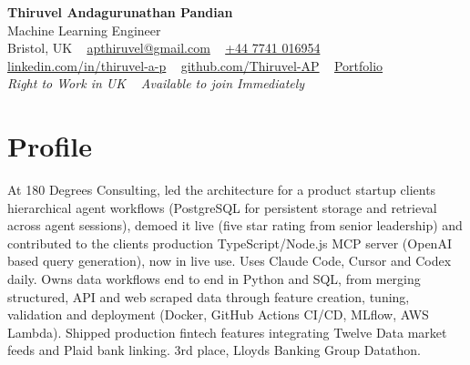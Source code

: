 \documentclass[a4paper,11pt]{article}
\begin{document}
\begin{center}
  {\fontsize{22}{26}\selectfont\bfseries\color{navy} Thiruvel Andagurunathan Pandian}\\[4pt]
  {\fontsize{12}{14}\selectfont\color{navy} Machine Learning Engineer}\\[4pt]
  {\small
  Bristol, UK\nobreak\ \,\textperiodcentered\, \href{mailto:apthiruvel@gmail.com}{apthiruvel@gmail.com}\nobreak\ \,\textperiodcentered\, \href{tel:+447741016954}{+44 7741 016954}\nobreak\ \,\textperiodcentered\, \href{https://www.linkedin.com/in/thiruvel-a-p/}{linkedin.com/in/thiruvel-a-p}\nobreak\ \,\textperiodcentered\, \href{https://github.com/Thiruvel-AP}{github.com/Thiruvel-AP}\nobreak\ \,\textperiodcentered\, \href{https://thiruvel-ap.github.io/PersonalPortfolio/}{Portfolio}}\\[3pt]
  {\small\itshape\color{muted} Right to Work in UK\nobreak\ \,\textperiodcentered\, Available to join Immediately}

\end{center}

\section{Profile}
At 180 Degrees Consulting, led the architecture for a product startup client\textquotesingle{}s hierarchical agent workflows (PostgreSQL for persistent storage and retrieval across agent sessions), demoed it live (five star rating from senior leadership) and contributed to the client\textquotesingle{}s production TypeScript/Node.js MCP server (OpenAI based query generation), now in live use. Uses Claude Code, Cursor and Codex daily. Owns data workflows end to end in Python and SQL, from merging structured, API and web scraped data through feature creation, tuning, validation and deployment (Docker, GitHub Actions CI/CD, MLflow, AWS Lambda). Shipped production fintech features integrating Twelve Data market feeds and Plaid bank linking. 3rd place, Lloyd\textquotesingle{}s Banking Group Datathon.
\end{document}
